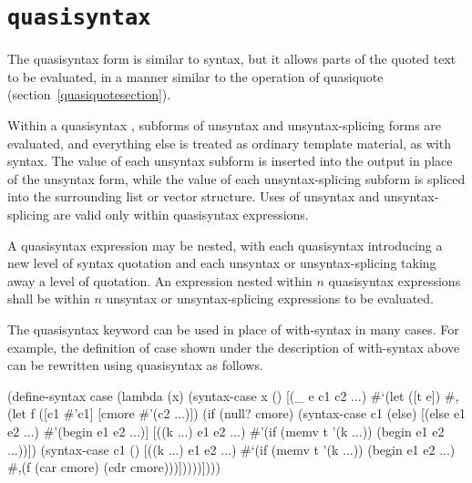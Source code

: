 \section{{\tt quasisyntax}}

\begin{entry}{%
}

The {\cf quasisyntax} form is similar to {\cf syntax}, but it allows parts
of the quoted text to be evaluated, in a manner similar to the operation
of {\cf quasiquote} (section~\ref{quasiquotesection}).

Within a {\cf quasisyntax} , subforms of
{\cf unsyntax} and {\cf unsyntax-splicing} forms are evaluated,
and everything else is treated as ordinary template material, as
with {\cf syntax}.
The value of each {\cf unsyntax} subform is inserted into the output
in place of the {\cf unsyntax} form, while the value of each
{\cf unsyntax-splicing} subform is spliced into the surrounding list
or vector structure.
Uses of {\cf unsyntax} and {\cf unsyntax-splicing} are valid only within
{\cf quasisyntax} expressions.

A {\cf quasisyntax} expression may be nested, with each {\cf quasisyntax}
introducing a new level of syntax quotation and each {\cf unsyntax} or
{\cf unsyntax-splicing} taking away a level of quotation.
An expression nested within $n$ {\cf quasisyntax} expressions shall
be within $n$ {\cf unsyntax} or {\cf unsyntax-splicing} expressions to
be evaluated.

The {\cf quasisyntax} keyword can be used in place of {\cf with-syntax} in many
cases.
For example, the definition of {\cf case} shown under the description
of {\cf with-syntax} above can be rewritten using {\cf quasisyntax}
as follows.

\begin{schemenoindent}
(define-syntax case
  (lambda (x)
    (syntax-case x ()
      [(\_ e c1 c2 ...)
       \#`(let ([t e])
           \#,(let f ([c1 \#'c1] [cmore \#'(c2 ...)])
               (if (null? cmore)
                   (syntax-case c1 (else)
                     [(else e1 e2 ...)
                      \#'(begin e1 e2 ...)]
                     [((k ...) e1 e2 ...)
                      \#'(if (memv t '(k ...))
                             (begin e1 e2 ...))])
                   (syntax-case c1 ()
                     [((k ...) e1 e2 ...)
                      \#`(if (memv t '(k ...))
                            (begin e1 e2 ...)
                            \#,(f (car cmore)
                                  (cdr cmore)))]))))])))
\end{schemenoindent}
                          

\end{entry}

